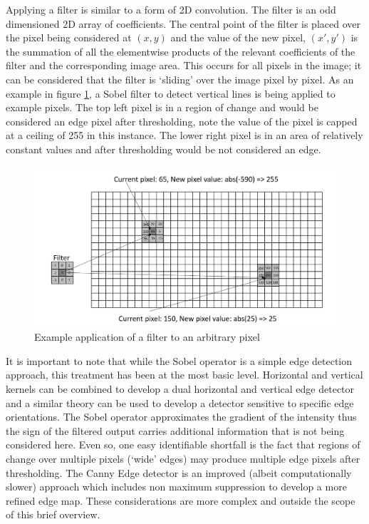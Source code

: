\documentclass{article}
\begin{document}
	 Applying a filter is similar to a form of 2D convolution. The filter is an odd dimensioned 2D array of coefficients. The central point of the filter is placed over the pixel being considered at $(x,y)$ and the value of the new pixel,  $(x',y')$ is the summation of all the elementwise products of the relevant coefficients of the filter and the corresponding image area. This occurs for all pixels in the image; it can be considered that the filter is `sliding' over the image pixel by pixel. As an example in figure \ref{filter}, a Sobel filter to detect vertical lines is being applied to example pixels. The top left pixel is in a region of change and would be considered an edge pixel after thresholding, note the value of the pixel is capped at a ceiling of 255 in this instance. The lower right pixel is in an area of relatively constant values and after thresholding would be not considered an edge.
	
	\begin{figure}
		\centering
		\includegraphics[width=5.0in]{filter}
		\caption{Example application of a filter to an arbitrary pixel}
		\label{filter}
	\end{figure}

	It is important to note that while the Sobel operator is a simple edge detection approach, this treatment has been at the most basic level. Horizontal and vertical kernels can be combined to develop a dual horizontal and vertical edge detector and a similar theory can be used to develop a detector sensitive to specific edge orientations. The Sobel operator approximates the gradient of the intensity thus the sign of the filtered output carries additional information that is not being considered here. Even so, one easy identifiable shortfall is the fact that regions of change over multiple pixels (`wide' edges) may produce multiple edge pixels after thresholding. The Canny Edge detector is an improved (albeit computationally slower) approach which includes non maximum suppression to develop a more refined edge map. These considerations are more complex and outside the scope of this brief overview.	
	
\end{document}
